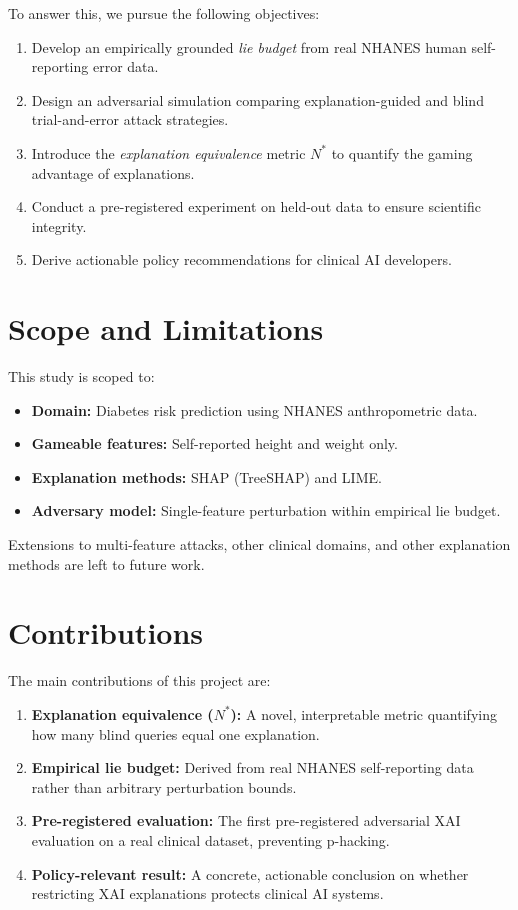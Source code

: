 \documentclass[12pt, a4paper, oneside]{report}
\theoremstyle{definition}
\begin{document}
To answer this, we pursue the following objectives:
\begin{enumerate}
  \item Develop an empirically grounded \textit{lie budget} from real NHANES
        human self-reporting error data.
  \item Design an adversarial simulation comparing explanation-guided and
        blind trial-and-error attack strategies.
  \item Introduce the \textit{explanation equivalence} metric $N^*$ to quantify
        the gaming advantage of explanations.
  \item Conduct a pre-registered experiment on held-out data to ensure
        scientific integrity.
  \item Derive actionable policy recommendations for clinical AI developers.
\end{enumerate}

\section{Scope and Limitations}

This study is scoped to:
\begin{itemize}
  \item \textbf{Domain:} Diabetes risk prediction using NHANES anthropometric data.
  \item \textbf{Gameable features:} Self-reported height and weight only.
  \item \textbf{Explanation methods:} SHAP (TreeSHAP) and LIME.
  \item \textbf{Adversary model:} Single-feature perturbation within empirical lie budget.
\end{itemize}

Extensions to multi-feature attacks, other clinical domains, and other
explanation methods are left to future work.

\section{Contributions}

The main contributions of this project are:
\begin{enumerate}
  \item \textbf{Explanation equivalence ($N^*$):} A novel, interpretable metric
        quantifying how many blind queries equal one explanation.
  \item \textbf{Empirical lie budget:} Derived from real NHANES self-reporting
        data rather than arbitrary perturbation bounds.
  \item \textbf{Pre-registered evaluation:} The first pre-registered adversarial
        XAI evaluation on a real clinical dataset, preventing p-hacking.
  \item \textbf{Policy-relevant result:} A concrete, actionable conclusion on
        whether restricting XAI explanations protects clinical AI systems.
\end{enumerate}
\end{document}
